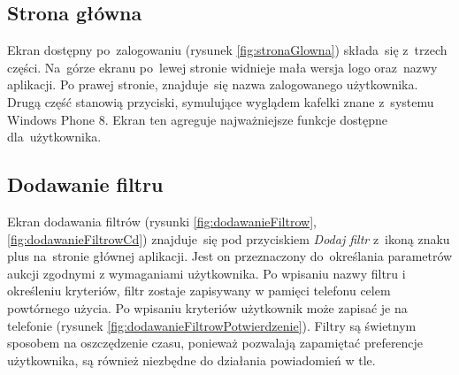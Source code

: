 \documentclass[a4paper,twoside,titlepage,openright]{book}
\begin{document}
\subsection{Strona główna}
Ekran dostępny po~zalogowaniu (rysunek \ref{fig:stronaGlowna}) składa~się z~trzech części. Na~górze ekranu po~lewej stronie widnieje mała wersja logo oraz~nazwy aplikacji. Po prawej stronie, znajduje~się nazwa zalogowanego użytkownika. Drugą część stanowią przyciski, symulujące wyglądem kafelki znane z~systemu Windows Phone 8. Ekran ten agreguje najważniejsze funkcje dostępne dla~użytkownika.

\subsection{Dodawanie filtru}
Ekran dodawania filtrów (rysunki \ref{fig:dodawanieFiltrow}, \ref{fig:dodawanieFiltrowCd}) znajduje~się pod przyciskiem \textit{Dodaj filtr} z~ikoną znaku plus na~stronie głównej aplikacji. Jest on przeznaczony do~określania parametrów aukcji zgodnymi z wymaganiami użytkownika. Po wpisaniu nazwy filtru i określeniu kryteriów, filtr zostaje zapisywany w pamięci telefonu celem powtórnego użycia. Po wpisaniu kryteriów użytkownik może zapisać je na telefonie (rysunek \ref{fig:dodawanieFiltrowPotwierdzenie}). Filtry są świetnym sposobem na oszczędzenie czasu, ponieważ pozwalają zapamiętać preferencje użytkownika, są również niezbędne do działania powiadomień w tle.
\end{document}
